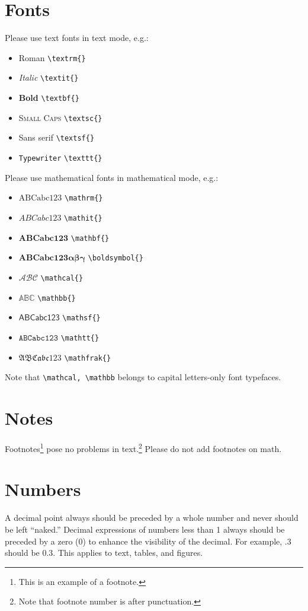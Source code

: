 \documentclass[ecta,nameyear,final,supplement]{econsocart}
\theoremstyle{plain}
\theoremstyle{definition}
\begin{document}
\section{Fonts}
Please use text fonts in text mode, e.g.:
\begin{itemize}
\item[]\textrm{Roman} \verb|\textrm{}|
\item[]\textit{Italic} \verb|\textit{}|
\item[]\textbf{Bold} \verb|\textbf{}|
\item[]\textsc{Small Caps} \verb|\textsc{}|
\item[]\textsf{Sans serif} \verb|\textsf{}|
\item[]\texttt{Typewriter} \verb|\texttt{}|
\end{itemize}
Please use mathematical fonts in mathematical mode, e.g.:
\begin{itemize}
\item[] $\mathrm{ABCabc123}$ \verb|\mathrm{}|
\item[] $\mathit{ABCabc123}$ \verb|\mathit{}|
\item[] $\mathbf{ABCabc123}$ \verb|\mathbf{}|
\item[] $\boldsymbol{ABCabc123\alpha\beta\gamma}$ \verb|\boldsymbol{}|
\item[] $\mathcal{ABC}$ \verb|\mathcal{}|
\item[] $\mathbb{ABC}$ \verb|\mathbb{}|
\item[] $\mathsf{ABCabc123}$ \verb|\mathsf{}| 
\item[] $\mathtt{ABCabc123}$ \verb|\mathtt{}|
\item[] $\mathfrak{ABCabc123}$ \verb|\mathfrak{}|
\end{itemize}
Note that \verb|\mathcal, \mathbb| belongs to capital letters-only font typefaces.

\section{Notes}
Footnotes\footnote{This is an example of a footnote.}
pose no problems in text.\footnote{Note that footnote number is after punctuation.} Please do not add footnotes on math. 

\section{Numbers}
A decimal point always should be preceded by a whole number and never should be left ``naked.'' Decimal expressions of numbers less than 1 always should be preceded by a zero (0) to enhance the visibility of the decimal. For example, .3 should be 0.3.   This applies to text, tables, and figures.
\end{document}
